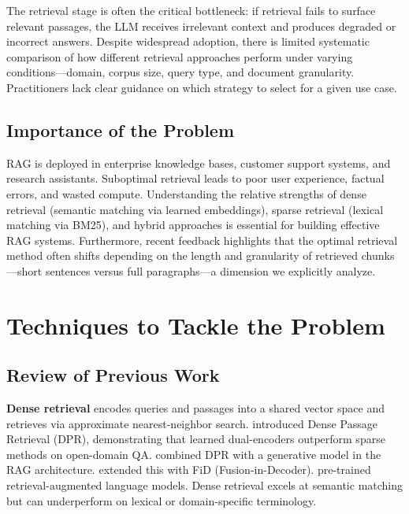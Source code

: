 \documentclass[twoside,11pt]{article}
\begin{document}
The retrieval stage is often the critical bottleneck: if retrieval fails to surface relevant passages, the LLM receives irrelevant context and produces degraded or incorrect answers. Despite widespread adoption, there is limited systematic comparison of how different retrieval approaches perform under varying conditions---domain, corpus size, query type, and document granularity. Practitioners lack clear guidance on which strategy to select for a given use case.

\subsection{Importance of the Problem}

RAG is deployed in enterprise knowledge bases, customer support systems, and research assistants. Suboptimal retrieval leads to poor user experience, factual errors, and wasted compute. Understanding the relative strengths of dense retrieval (semantic matching via learned embeddings), sparse retrieval (lexical matching via BM25), and hybrid approaches is essential for building effective RAG systems. Furthermore, recent feedback highlights that the optimal retrieval method often shifts depending on the length and granularity of retrieved chunks---short sentences versus full paragraphs---a dimension we explicitly analyze.

\section{Techniques to Tackle the Problem}

\subsection{Review of Previous Work}

\textbf{Dense retrieval} encodes queries and passages into a shared vector space and retrieves via approximate nearest-neighbor search. \citet{karpukhin2020dense} introduced Dense Passage Retrieval (DPR), demonstrating that learned dual-encoders outperform sparse methods on open-domain QA. \citet{lewis2020rag} combined DPR with a generative model in the RAG architecture. \citet{izacard2021leveraging} extended this with FiD (Fusion-in-Decoder). \citet{guu2020realm} pre-trained retrieval-augmented language models. Dense retrieval excels at semantic matching but can underperform on lexical or domain-specific terminology.
\end{document}
